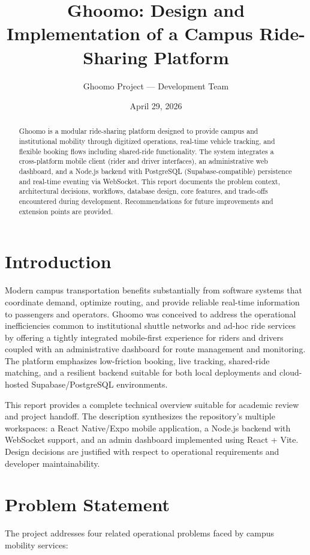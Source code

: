 \documentclass[12pt,a4paper]{article}
\title{Ghoomo: Design and Implementation of a Campus Ride-Sharing Platform}
\author{Ghoomo Project — Development Team}
\date{April 29, 2026}
\begin{document}
\maketitle
\thispagestyle{empty}
\newpage

\begin{abstract}
Ghoomo is a modular ride-sharing platform designed to provide campus and institutional mobility through digitized operations, real-time vehicle tracking, and flexible booking flows including shared-ride functionality. The system integrates a cross-platform mobile client (rider and driver interfaces), an administrative web dashboard, and a Node.js backend with PostgreSQL (Supabase-compatible) persistence and real-time eventing via WebSocket. This report documents the problem context, architectural decisions, workflows, database design, core features, and trade-offs encountered during development. Recommendations for future improvements and extension points are provided.
\end{abstract}

\tableofcontents
\newpage

\section{Introduction}
Modern campus transportation benefits substantially from software systems that coordinate demand, optimize routing, and provide reliable real-time information to passengers and operators. Ghoomo was conceived to address the operational inefficiencies common to institutional shuttle networks and ad-hoc ride services by offering a tightly integrated mobile-first experience for riders and drivers coupled with an administrative dashboard for route management and monitoring. The platform emphasizes low-friction booking, live tracking, shared-ride matching, and a resilient backend suitable for both local deployments and cloud-hosted Supabase/PostgreSQL environments.

This report provides a complete technical overview suitable for academic review and project handoff. The description synthesizes the repository's multiple workspaces: a React Native/Expo mobile application, a Node.js backend with WebSocket support, and an admin dashboard implemented using React + Vite. Design decisions are justified with respect to operational requirements and developer maintainability.

\section{Problem Statement}
The project addresses four related operational problems faced by campus mobility services:
\end{document}
